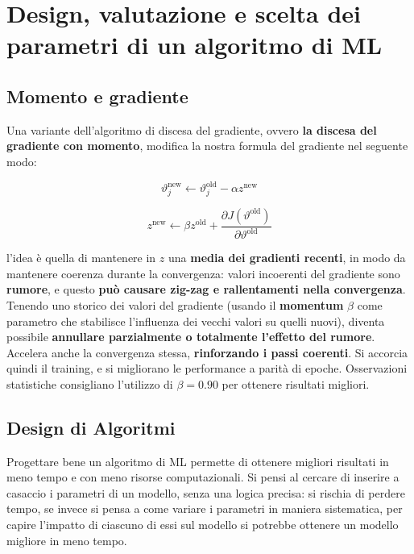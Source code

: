 \chapter{Design, valutazione e scelta dei parametri di un algoritmo di ML}

\section{Momento e gradiente}
Una variante dell'algoritmo di discesa del gradiente, ovvero \textbf{la discesa del gradiente con momento}, modifica la nostra formula del gradiente nel seguente modo:

$$
\vartheta_j^\text{new} \leftarrow \vartheta_j^\text{old} - \alpha z^\text{new}
$$

$$
z^\text{new} \leftarrow \beta z^\text{old} + \frac{\partial J(\vartheta^\text{old})}{\partial \vartheta^\text{old}} 
$$

l'idea è quella di mantenere in $z$ una \textbf{media dei gradienti recenti}, in modo da mantenere coerenza durante la convergenza: valori incoerenti del gradiente sono \textbf{rumore}, e questo \textbf{può causare zig-zag e rallentamenti nella convergenza}. Tenendo uno storico dei valori del gradiente (usando il \textbf{momentum} $\beta$ come parametro che stabilisce l'influenza dei vecchi valori su quelli nuovi), diventa possibile \textbf{annullare parzialmente o totalmente l'effetto del rumore}. Accelera anche la convergenza stessa, \textbf{rinforzando i passi coerenti}. Si accorcia quindi il training, e si migliorano le performance a parità di epoche. Osservazioni statistiche consigliano l'utilizzo di $\beta = 0.90$ per ottenere risultati migliori.


\section{Design di Algoritmi}
Progettare bene un algoritmo di ML permette di ottenere migliori risultati in meno tempo e con meno risorse computazionali. Si pensi al cercare di inserire a casaccio i parametri di un modello, senza una logica precisa: si rischia di perdere tempo, se invece si pensa a come variare i parametri in maniera sistematica, per capire l'impatto di ciascuno di essi sul modello si potrebbe ottenere un modello migliore in meno tempo.

